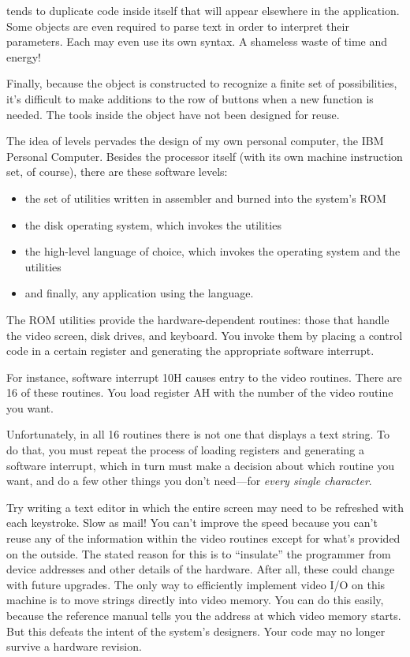 tends to duplicate code inside itself that will appear elsewhere in
the application. Some objects are even required to parse text in order
to interpret their parameters. Each may even use its own syntax. A
shameless waste of time and energy!


Finally, because the object is constructed to recognize a finite set
of possibilities, it's difficult to make additions to the row of
buttons when a new function is needed. The tools inside the object
have not been designed for reuse.

The idea of levels pervades the design of my own personal computer,
the IBM Personal Computer. Besides the processor itself (with its own
machine instruction set, of course), there are these software levels:

\begin{itemize}
	\item the set of utilities written in assembler and burned into the system's ROM
	\item the disk operating system, which invokes the utilities
	\item the high-level language of choice, which invokes the operating system and
	the utilities
	\item and finally, any application using the language.
\end{itemize}

The ROM utilities provide the hardware-dependent routines: those that
handle the video screen, disk drives, and keyboard. You invoke them by
placing a control code in a certain register and generating the appropriate
software interrupt.

For instance, software interrupt 10H causes entry to the video
routines. There are 16 of these routines. You load register AH with the
number of the video routine you want.

Unfortunately, in all 16 routines there is not one that displays a text
string. To do that, you must repeat the process of loading registers and
generating a software interrupt, which in turn must make a decision
about which routine you want, and do a few other things you don't
need---for \emph{every single character}.

Try writing a text editor in which the entire screen may need to be
refreshed with each keystroke. Slow as mail! You can't improve the speed
because you can't reuse any of the information within the video routines
except for what's provided on the outside. The stated reason for this is to
``insulate'' the programmer from device addresses and other details of
the hardware. After all, these could change with future upgrades.
The only way to efficiently implement video I/O on this machine is
to move strings directly into video memory. You can do this easily,
because the reference manual tells you the address at which video
memory starts. But this defeats the intent of the system's designers.
Your code may no longer survive a hardware revision.

